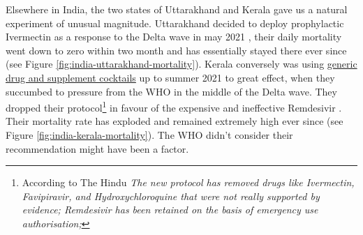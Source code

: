 \documentclass[11pt,a4paper,notitlepage]{report}
\begin{document}
Elsewhere in India, the two states of Uttarakhand and Kerala gave us a natural experiment of unusual magnitude. Uttarakhand decided to deploy prophylactic Ivermectin as a response to the Delta wave in may 2021 \cite{economictimes12052021}, their daily mortality went down to zero within two month and has essentially stayed there ever since (see Figure \ref{fig:india-uttarakhand-mortality}). Kerala conversely was using \href{https://dhs.kerala.gov.in/wp-content/uploads/2021/04/Kerala-State-COVID-19-guidelines-Version-3.pdf}{generic drug and supplement cocktails} up to summer 2021 \cite{keralagov24042021} to great effect, when they succumbed to pressure from the WHO in the middle of the Delta wave. They dropped their protocol\footnote{According to The Hindu \cite{hindu06082021} \textit{The new protocol has removed drugs like Ivermectin, Favipiravir, and Hydroxychloroquine that were not really supported by evidence; Remdesivir has been retained on the basis of emergency use authorisation;}} in favour of the expensive and ineffective Remdesivir \cite{hindu06082021}. Their mortality rate has exploded and remained extremely high ever since (see Figure \ref{fig:india-kerala-mortality}). The WHO didn't consider their recommendation might have been a factor.   
\end{document}
